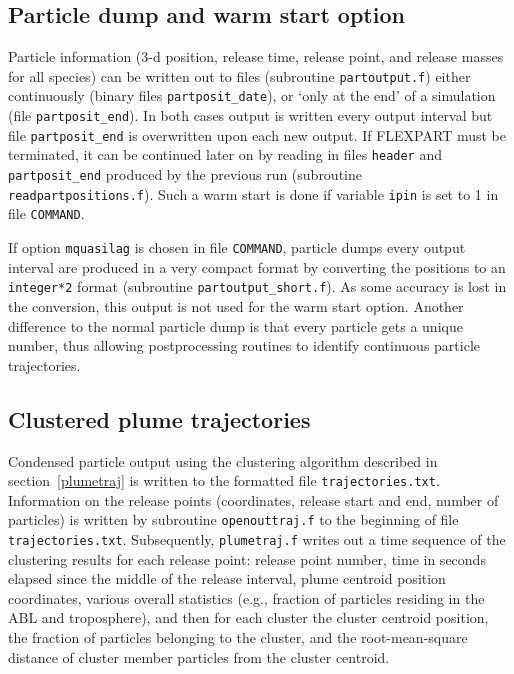 \documentclass{egu}                  %
\begin{document}
\subsection{Particle dump and warm start option}

Particle information (3-d position, release time, release point, and release
masses for all species) can be written out to files (subroutine
\verb|partoutput.f|) either continuously (binary files \verb|partposit_date|),
or `only at the end' of a simulation (file \verb|partposit_end|).  In both
cases output is written every output interval but file \verb|partposit_end| is
overwritten upon each new output.  If FLEXPART must be terminated, it can be
continued later on by reading in files \verb|header| and \verb|partposit_end|
produced by the previous run (subroutine \verb|readpartpositions.f|).  Such a
warm start is done if variable \verb|ipin| is set to 1 in file \verb|COMMAND|.

If option \verb|mquasilag| is chosen in file \verb|COMMAND|, particle dumps
every output interval are produced in a very compact format by converting the
positions to an \verb|integer*2| format (subroutine \verb|partoutput_short.f|).
As some accuracy is lost in the conversion, this output is not used for the
warm start option.  Another difference to the normal particle dump is that
every particle gets a unique number, thus allowing postprocessing routines to
identify continuous particle trajectories.

\subsection{Clustered plume trajectories}

Condensed particle output using the clustering algorithm described in
section~\ref{plumetraj} is written to the formatted file
\verb|trajectories.txt|.  Information on the release points (coordinates,
release start and end, number of particles) is written by subroutine
\verb|openouttraj.f| to the beginning of file \verb|trajectories.txt|.
Subsequently, \verb|plumetraj.f| writes out a time sequence of the clustering
results for each release point: release point number, time in seconds elapsed
since the middle of the release interval, plume centroid position coordinates,
various overall statistics (e.g., fraction of particles residing in the ABL and
troposphere), and then for each cluster the cluster centroid position, the
fraction of particles belonging to the cluster, and the root-mean-square
distance of cluster member particles from the cluster centroid.
\end{document}
